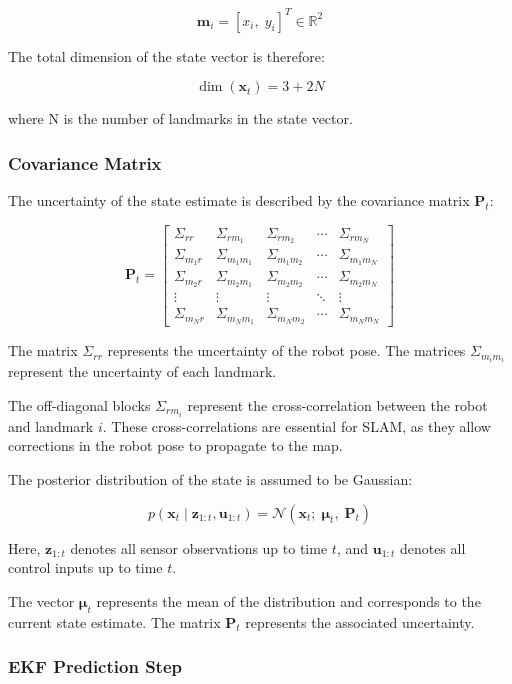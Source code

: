 \documentclass[11pt]{article}
\begin{document}
\[
\mathbf{m}_i = [x_i,\; y_i]^T \in \mathbb{R}^2
\]

The total dimension of the state vector is therefore:

\[
\dim(\mathbf{x}_t) = 3 + 2N
\]

where N is the number of landmarks in the state vector.

\subsubsection{Covariance Matrix}

The uncertainty of the state estimate is described by the covariance matrix
$\mathbf{P}_t$:

\[
\mathbf{P}_t =
\begin{bmatrix}
	\Sigma_{rr} & \Sigma_{rm_1} & \Sigma_{rm_2} & \cdots & \Sigma_{rm_N} \\
	\Sigma_{m_1r} & \Sigma_{m_1m_1} & \Sigma_{m_1m_2} & \cdots & \Sigma_{m_1m_N} \\
	\Sigma_{m_2r} & \Sigma_{m_2m_1} & \Sigma_{m_2m_2} & \cdots & \Sigma_{m_2m_N} \\
	\vdots & \vdots & \vdots & \ddots & \vdots \\
	\Sigma_{m_Nr} & \Sigma_{m_Nm_1} & \Sigma_{m_Nm_2} & \cdots & \Sigma_{m_Nm_N}
\end{bmatrix}
\]

The matrix $\Sigma_{rr}$ represents the uncertainty of the robot pose.
The matrices $\Sigma_{m_im_i}$ represent the uncertainty of each landmark.

The off-diagonal blocks $\Sigma_{rm_i}$ represent the cross-correlation
between the robot and landmark $i$.
These cross-correlations are essential for SLAM,
as they allow corrections in the robot pose to propagate to the map.

The posterior distribution of the state is assumed to be Gaussian:

\[
p(\mathbf{x}_t \mid \mathbf{z}_{1:t}, \mathbf{u}_{1:t})
=
\mathcal{N}(\mathbf{x}_t;\; \boldsymbol{\mu}_t,\; \mathbf{P}_t)
\]

Here, $\mathbf{z}_{1:t}$ denotes all sensor observations up to time $t$,
and $\mathbf{u}_{1:t}$ denotes all control inputs up to time $t$.

The vector $\boldsymbol{\mu}_t$ represents the mean of the distribution
and corresponds to the current state estimate.
The matrix $\mathbf{P}_t$ represents the associated uncertainty.

\subsubsection{EKF Prediction Step}
\end{document}
